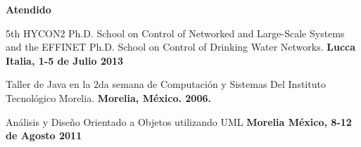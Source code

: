 \documentclass[10pt]{article}
\newenvironment{innerlist}[1][\enskip\textbullet]%
        {\begin{compactitem}[#1]}{\end{compactitem}}
\newcommand{\blankline}{\quad\pagebreak[2]}
\begin{document}
\blankline

\textbf{Atendido}
\begin{innerlist}
\item 5th HYCON2 Ph.D. School on Control of Networked and Large-Scale Systems and the EFFINET Ph.D. School on Control of Drinking Water Networks. \textbf{Lucca Italia, 1-5 de Julio 2013}
\item Taller de Java en la 2da semana de Computación y Sistemas Del Instituto Tecnológico Morelia. \textbf{Morelia, México. 2006.}
\item Análisis y Diseño Orientado a Objetos utilizando  UML  \textbf{Morelia México,  8-12 de Agosto 2011}

\end{innerlist}
\end{document}

